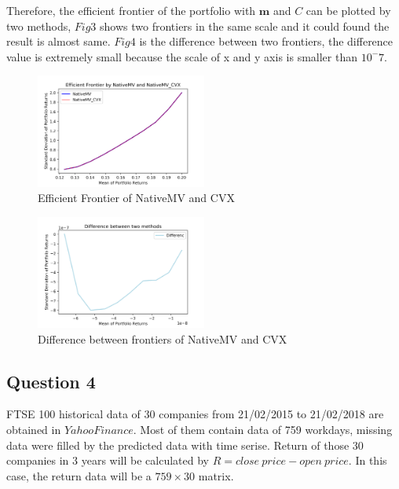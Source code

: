 \documentclass[sigconf]{acmart}
\begin{document}
Therefore, the efficient frontier of the portfolio with $\bm{m}$ and $C$ can be plotted by two methods, $Fig3$ shows two frontiers in the same scale and it could found the result is almost same. $Fig4$ is the difference between two frontiers, the difference value is extremely small because the scale of x and y axis is smaller than $10^-7$. 

\begin{figure}[htbp]
    \centering
    \includegraphics[width=0.5\textwidth]{5.png}
    \caption{\label{}Efficient Frontier of NativeMV and CVX}
\end{figure}

\begin{figure}[htbp]
    \centering
    \includegraphics[width=0.5\textwidth]{6.png}
    \caption{\label{}Difference between frontiers of NativeMV and CVX}
\end{figure}


\subsection{Question 4}\label{q4}

FTSE 100 historical data of 30 companies from 21/02/2015 to 21/02/2018 are obtained in $Yahoo Finance$. Most of them contain data of 759 workdays, missing data were filled by the predicted data with time serise. Return of those 30 companies in 3 years will be calculated by $R = close\ price - open\ price$. In this case, the return data will be a $759\times30$ matrix.
\end{document}
